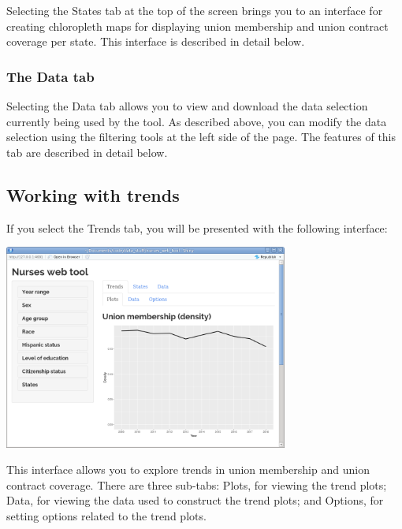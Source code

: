 \documentclass[letterpaper,12pt]{article}
\begin{document}
Selecting the States tab at the top of the screen brings you to an
interface for creating chloropleth maps for displaying union
membership and union contract coverage per state. This interface is
described in detail below.

\subsubsection{The Data tab}

Selecting the Data tab allows you to view and download the data
selection currently being used by the tool. As described above, you
can modify the data selection using the filtering tools at the left
side of the page. The features of this tab are described in detail
below.

\subsection{Working with trends}

If you select the Trends tab, you will be presented with the following
interface:
\begin{center}
  \includegraphics[width=0.7\textwidth]{images/trends_interface.png}
\end{center}
This interface allows you to explore trends in union membership and
union contract coverage. There are three sub-tabs: Plots, for viewing
the trend plots; Data, for viewing the data used to construct the
trend plots; and Options, for setting options related to the trend
plots.
\end{document}

